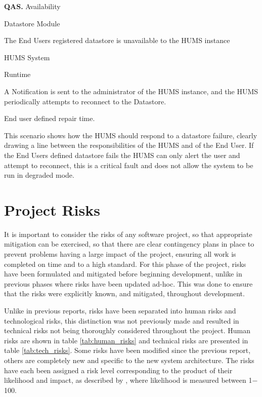 \documentclass[10pt,a4paper]{article}
\newcommand{\qas}[1]{\textcolor{reqColor}{\textbf{QAS.#1}}}
\newenvironment{scenario}[1]{
\newcommand{\source}[1]{\item[Source of Stimulus:] ##1}
\newcommand{\stimulus}[1]{\item[Stimulus:] ##1}
\newcommand{\artifact}[1]{\item[Artifact:] ##1}
\newcommand{\environment}[1]{\item[Environment:] ##1}
\newcommand{\response}[1]{\item[Response:] ##1}
\newcommand{\measure}[1]{\item[Response Measure:] ##1}
\newcommand{\rationale}[1]{\item[Scenario Rationale:] ##1}
\newcommand{\quality}[1]{\item[Quality:] ##1}
		\begin{description} [noitemsep]	
		\item[Scenario ID:] \qas{#1}
		}{\end{description} \vspace*{0.3cm}
		}
\begin{document}
\begin{scenario}{4}
\quality{Availability}
\source{Datastore Module}
\stimulus{The End Users registered datastore is unavailable to the HUMS instance}
\artifact{HUMS System}
\environment{Runtime}
\response{A Notification is sent to the administrator of the HUMS instance, and the HUMS periodically attempts to reconnect to the Datastore.}
\measure{End user defined repair time.}
\rationale{This scenario shows how the HUMS should respond to a datastore failure, clearly drawing a line between the responsibilities of the HUMS and of the End User. If the End Users defined datastore fails the HUMS can only alert the user and attempt to reconnect, this is a critical fault and does not allow the system to be run in degraded mode.}
\end{scenario}

\section{Project Risks}
\label{sec:risks}
It is important to consider the risks of any software project, so that appropriate mitigation can be exercised, so that there are clear contingency plans in place to prevent problems having a large impact of the project, ensuring all work is completed on time and to a high standard. For this phase of the project, risks have been formulated and mitigated before beginning development, unlike in previous phases where risks have been updated ad-hoc. This was done to ensure that the risks were explicitly known, and mitigated, throughout development. 

Unlike in previous reports, risks have been separated into human risks and technological risks, this distinction was not previously made and resulted in technical risks not being thoroughly considered throughout the project. Human risks are shown in table \ref{tab:human_risks} and technical risks are presented in table \ref{tab:tech_risks}.
Some risks have been modified since the previous report, others are completely new and specific to the new system architecture. The risks have each been assigned a risk level corresponding to the product of their likelihood and impact, as described by \cite{risks}, where likelihood is measured between 1$-$100.
\end{document}
